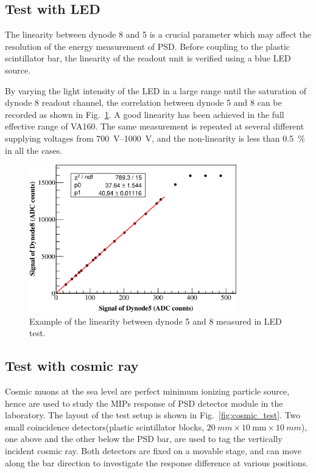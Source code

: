 \documentclass[5p, times]{elsarticle}
\begin{document}
\subsection{Test with LED}
\label{sec:led}
The linearity between dynode 8 and 5 is a crucial parameter which may affect the resolution of the energy measurement of PSD.
Before coupling to the plastic scintillator bar, the linearity of the readout unit is verified using a blue LED source.

By varying the light intensity of the LED in a large range until the saturation of dynode 8 readout channel, the correlation between dynode 5 and 8 can be recorded as shown in Fig.~\ref{fig:linearity}.
A good linearity has been achieved in the full effective range of VA160.
The same measurement is repeated at several different supplying voltages from \SIrange{700}{1000}{\volt}, and the non-linearity is less than \SI{0.5}{\percent} in all the cases.

\begin{figure}
\centering
\includegraphics[width=90mm]{linearity}
\caption{Example of the linearity between dynode 5 and 8 measured in LED test.}
\label{fig:linearity}
\end{figure}

\subsection{Test with cosmic ray}
\label{sec:cosmicray}
Cosmic muons at the sea level are perfect minimum ionizing particle source, hence are used to study the MIPs response of PSD detector module in the laboratory.
The layout of the test setup is shown in Fig.~\ref{fig:cosmic_test}.
Two small coincidence detectors(plastic scintillator blocks, $\SI{20}{mm} \times \SI{10}{\milli\meter} \times \SI{10}{mm}$), one above and the other below the PSD bar, are used to tag the vertically incident cosmic ray.
Both detectors are fixed on a movable stage, and can move along the bar direction to investigate the response difference at various positions. 
\end{document}
